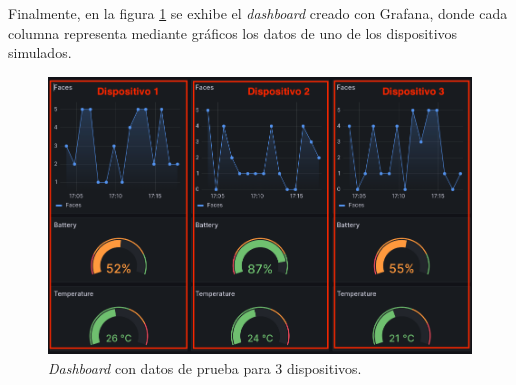 Finalmente, en la figura \ref{fig:test_dashboard} se exhibe el \textit{dashboard} creado con Grafana, donde cada columna representa mediante gráficos los datos de uno de los dispositivos simulados.
\begin{figure}[h]
	\centering
	\includegraphics[scale=0.3]{./Figures/test_dashboard.png}
	\caption{\textit{Dashboard} con datos de prueba para 3 dispositivos.}
	\label{fig:test_dashboard}
\end{figure}
